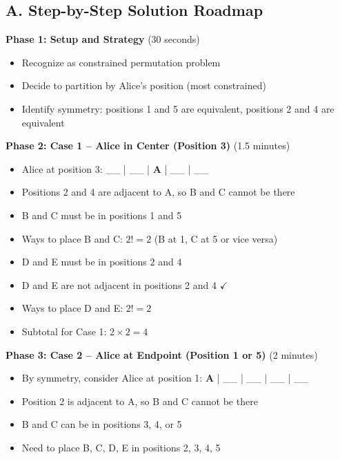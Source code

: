 \documentclass[]{article}
\begin{document}
\begin{solutionbox}
\subsection*{A. Step-by-Step Solution Roadmap}

\textbf{Phase 1: Setup and Strategy} (30 seconds)
\begin{itemize}[leftmargin=*]
    \item Recognize as constrained permutation problem
    \item Decide to partition by Alice's position (most constrained)
    \item Identify symmetry: positions 1 and 5 are equivalent, positions 2 and 4 are equivalent
\end{itemize}

\textbf{Phase 2: Case 1 -- Alice in Center (Position 3)} (1.5 minutes)
\begin{itemize}[leftmargin=*]
    \item Alice at position 3: \_\_ | \_\_ | \textbf{A} | \_\_ | \_\_
    \item Positions 2 and 4 are adjacent to A, so B and C cannot be there
    \item B and C must be in positions 1 and 5
    \item Ways to place B and C: $2! = 2$ (B at 1, C at 5 or vice versa)
    \item D and E must be in positions 2 and 4
    \item D and E are not adjacent in positions 2 and 4 $\checkmark$
    \item Ways to place D and E: $2! = 2$
    \item Subtotal for Case 1: $2 \times 2 = \boxed{4}$
\end{itemize}

\textbf{Phase 3: Case 2 -- Alice at Endpoint (Position 1 or 5)} (2 minutes)
\begin{itemize}[leftmargin=*]
    \item By symmetry, consider Alice at position 1: \textbf{A} | \_\_ | \_\_ | \_\_ | \_\_
    \item Position 2 is adjacent to A, so B and C cannot be there
    \item B and C can be in positions 3, 4, or 5
    \item Need to place B, C, D, E in positions 2, 3, 4, 5
    

\end{itemize}
\end{solutionbox}
\end{document}
